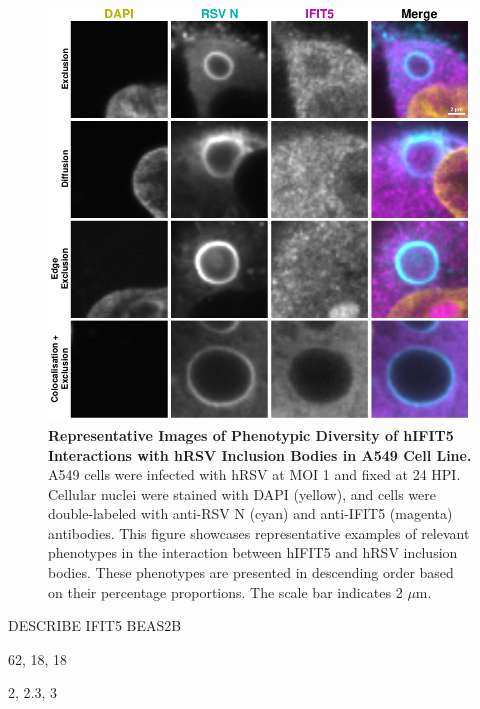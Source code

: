 \begin{figure}
    \centering
    \includegraphics[width=1\linewidth]{08. Chapter 3/Figs/02. Infection/04. IFIT5/03. a549 i5.pdf}
    \caption[Representative Images of Phenotypic Diversity of hIFIT5 Interactions with hRSV Inclusion Bodies in A549 Cell Line.]{\textbf{Representative Images of Phenotypic Diversity of hIFIT5 Interactions with hRSV Inclusion Bodies in A549 Cell Line.} A549 cells were infected with hRSV at MOI 1 and fixed at 24 HPI. Cellular nuclei were stained with DAPI (yellow), and cells were double-labeled with anti-RSV N (cyan) and anti-IFIT5 (magenta) antibodies. This figure showcases representative examples of relevant phenotypes in the interaction between hIFIT5 and hRSV inclusion bodies. These phenotypes are presented in descending order based on their percentage proportions. The scale bar indicates 2 \(\mu \mbox{m}\).}
    \label{fig:Representative Images of Phenotypic Diversity of hIFIT5 Interactions with hRSV Inclusion Bodies in A549 Cell Line}
\end{figure}

DESCRIBE IFIT5 BEAS2B

62, 18, 18

2, 2.3, 3

